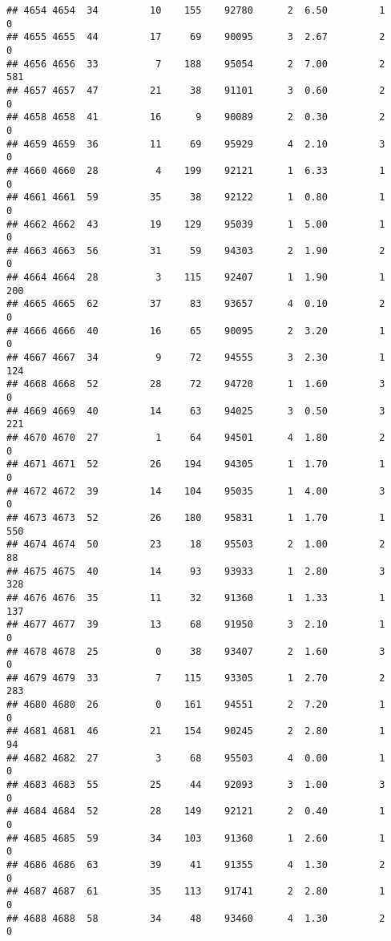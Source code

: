\documentclass[
]{article}
\begin{document}
\begin{verbatim}
## 4654 4654  34         10    155    92780      2  6.50         1        0
## 4655 4655  44         17     69    90095      3  2.67         2        0
## 4656 4656  33          7    188    95054      2  7.00         2      581
## 4657 4657  47         21     38    91101      3  0.60         2        0
## 4658 4658  41         16      9    90089      2  0.30         2        0
## 4659 4659  36         11     69    95929      4  2.10         3        0
## 4660 4660  28          4    199    92121      1  6.33         1        0
## 4661 4661  59         35     38    92122      1  0.80         1        0
## 4662 4662  43         19    129    95039      1  5.00         1        0
## 4663 4663  56         31     59    94303      2  1.90         2        0
## 4664 4664  28          3    115    92407      1  1.90         1      200
## 4665 4665  62         37     83    93657      4  0.10         2        0
## 4666 4666  40         16     65    90095      2  3.20         1        0
## 4667 4667  34          9     72    94555      3  2.30         1      124
## 4668 4668  52         28     72    94720      1  1.60         3        0
## 4669 4669  40         14     63    94025      3  0.50         3      221
## 4670 4670  27          1     64    94501      4  1.80         2        0
## 4671 4671  52         26    194    94305      1  1.70         1        0
## 4672 4672  39         14    104    95035      1  4.00         3        0
## 4673 4673  52         26    180    95831      1  1.70         1      550
## 4674 4674  50         23     18    95503      2  1.00         2       88
## 4675 4675  40         14     93    93933      1  2.80         3      328
## 4676 4676  35         11     32    91360      1  1.33         1      137
## 4677 4677  39         13     68    91950      3  2.10         1        0
## 4678 4678  25          0     38    93407      2  1.60         3        0
## 4679 4679  33          7    115    93305      1  2.70         2      283
## 4680 4680  26          0    161    94551      2  7.20         1        0
## 4681 4681  46         21    154    90245      2  2.80         1       94
## 4682 4682  27          3     68    95503      4  0.00         1        0
## 4683 4683  55         25     44    92093      3  1.00         3        0
## 4684 4684  52         28    149    92121      2  0.40         1        0
## 4685 4685  59         34    103    91360      1  2.60         1        0
## 4686 4686  63         39     41    91355      4  1.30         2        0
## 4687 4687  61         35    113    91741      2  2.80         1        0
## 4688 4688  58         34     48    93460      4  1.30         2        0

\end{verbatim}
\end{document}
